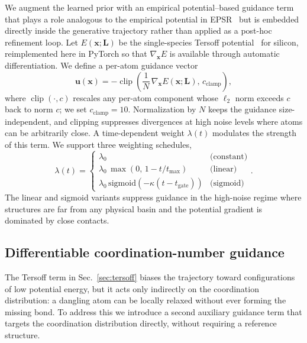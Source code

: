 We augment the learned prior with an empirical potential--based guidance
term that plays a role analogous to the empirical potential in EPSR~\cite{soper2005empirical}
but is embedded directly inside the generative trajectory rather than applied
as a post-hoc refinement loop. Let $E(\mathbf{x};\mathbf{L})$ be the single-species
Tersoff potential~\cite{tersoff1988new} for silicon, reimplemented here in
PyTorch so that $\nabla_{\mathbf{x}}E$ is available through automatic
differentiation. We define a per-atom guidance vector
\begin{equation}
    \mathbf{u}(\mathbf{x})
    = -\operatorname{clip}\!\left(
        \frac{1}{N}\,\nabla_{\mathbf{x}} E(\mathbf{x};\mathbf{L}),\,
        c_{\mathrm{clamp}}
      \right),
    \label{eq:tersoff-guide}
\end{equation}
where $\operatorname{clip}(\cdot,c)$ rescales any per-atom component whose
$\ell_2$ norm exceeds $c$ back to norm $c$; we set $c_{\mathrm{clamp}}=10$.
Normalization by $N$ keeps the guidance size-independent, and clipping
suppresses divergences at high noise levels where atoms can be arbitrarily
close. A time-dependent weight $\lambda(t)$ modulates the strength of this
term. We support three weighting schedules,
\begin{equation}
    \lambda(t) =
    \begin{cases}
        \lambda_0 & \text{(constant)} \\
        \lambda_0\,\max\!\left(0,\,1-t/t_{\max}\right) & \text{(linear)} \\
        \lambda_0\,\mathrm{sigmoid}\!\left(-\kappa(t-t_{\mathrm{gate}})\right) & \text{(sigmoid)}
    \end{cases}.
    \label{eq:tersoff-schedule}
\end{equation}
The linear and sigmoid variants suppress guidance in the high-noise regime
where structures are far from any physical basin and the potential gradient
is dominated by close contacts.

\subsection{Differentiable coordination-number guidance}
\label{sec:coord-guidance}

The Tersoff term in Sec.~\ref{sec:tersoff} biases the trajectory toward
configurations of low potential energy, but it acts only indirectly on the
coordination distribution: a dangling atom can be locally relaxed without ever
forming the missing bond. To address this we introduce a second auxiliary
guidance term that targets the coordination distribution directly, without
requiring a reference structure.

